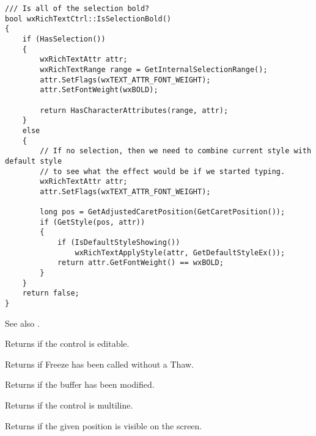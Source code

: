 \begin{verbatim}
/// Is all of the selection bold?
bool wxRichTextCtrl::IsSelectionBold()
{
    if (HasSelection())
    {
        wxRichTextAttr attr;
        wxRichTextRange range = GetInternalSelectionRange();
        attr.SetFlags(wxTEXT_ATTR_FONT_WEIGHT);
        attr.SetFontWeight(wxBOLD);

        return HasCharacterAttributes(range, attr);
    }
    else
    {
        // If no selection, then we need to combine current style with default style
        // to see what the effect would be if we started typing.
        wxRichTextAttr attr;
        attr.SetFlags(wxTEXT_ATTR_FONT_WEIGHT);

        long pos = GetAdjustedCaretPosition(GetCaretPosition());
        if (GetStyle(pos, attr))
        {
            if (IsDefaultStyleShowing())
                wxRichTextApplyStyle(attr, GetDefaultStyleEx());
            return attr.GetFontWeight() == wxBOLD;
        }
    }
    return false;
}
\end{verbatim}

See also .

\label{wxrichtextctrliseditable}


Returns \true if the control is editable.

\label{wxrichtextctrlisfrozen}


Returns \true if Freeze has been called without a Thaw.

\label{wxrichtextctrlismodified}


Returns \true if the buffer has been modified.

\label{wxrichtextctrlismultiline}


Returns \true if the control is multiline.

\label{wxrichtextctrlispositionvisible}


Returns \true if the given position is visible on the screen.

